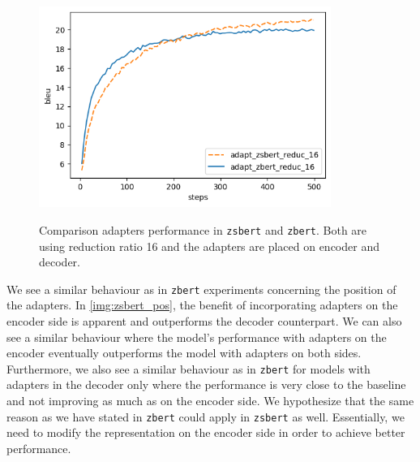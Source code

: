 \begin{figure}[t]
    {\includegraphics[width=0.85\textwidth]{img/zbert_vs_zsbert.png}}
    \centering
    \caption{Comparison adapters performance in \texttt{zsbert} and \texttt{zbert}. Both are using reduction ratio 16 and the adapters are placed on encoder and decoder.}
    \label{img:zbert_vs_zsbert}
\end{figure}

We see a similar behaviour as in \texttt{zbert} experiments concerning the position of the adapters. In \cref{img:zsbert_pos}, the benefit of incorporating adapters on the encoder side is apparent and outperforms the decoder counterpart. We can also see a similar behaviour where the model's performance with adapters on the encoder eventually outperforms the model with adapters on both sides. Furthermore, we also see a similar behaviour as in \texttt{zbert} for models with adapters in the decoder only where the performance is very close to the baseline and not improving as much as on the encoder side. We hypothesize that the same reason as we have stated in \texttt{zbert} could apply in \texttt{zsbert} as well. Essentially, we need to modify the representation on the encoder side in order to achieve better performance.
